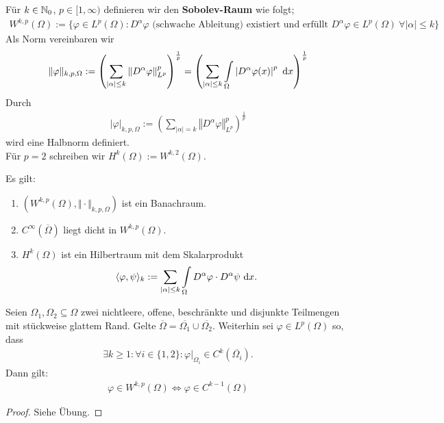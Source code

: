 \begin{definition}
Für $k\in\mathbb{N}_0$, $p\in[1,\infty)$ definieren wir den \textbf{Sobolev-Raum} wie folgt;
\begin{align}
W^{k,p}(\Omega):=\Big\lbrace\varphi\in L^p(\Omega):D^\alpha\varphi\text{ (schwache Ableitung) existiert und erfüllt }D^\alpha\varphi\in L^p(\Omega)~\forall|\alpha|\leq k\Big\rbrace
\end{align}
Als Norm vereinbaren wir
\begin{align*}
\Vert\varphi\Vert_{k,p,\Omega}:=\left(\sum\limits_{|\alpha|\leq k}\left\Vert D^\alpha\varphi\right\Vert^p_{L^p}\right)^{\frac{1}{p}}
=\left(\sum\limits_{|\alpha|\leq k}\int\limits_\Omega\left| D^\alpha\varphi(x)\right|^p\text{ d} x\right)^{\frac{1}{p}}
\end{align*}
Durch
\begin{align*}
|\varphi|_{k,p,\Omega}:=\left(\sum\limits_{|\alpha|= k}\left\Vert D^\alpha\varphi\right\Vert^p_{L^p}\right)^{\frac{1}{p}}
\end{align*}
wird eine Halbnorm definiert.\\
Für $p=2$ schreiben wir $H^k(\Omega):=W^{k,2}(\Omega)$.
\end{definition}

\begin{satz}
Es gilt:
\begin{enumerate}
\item $\left(W^{k,p}(\Omega),\Vert\cdot\Vert_{k,p,\Omega}\right)$ ist ein Banachraum.
\item $C^\infty(\overline{\Omega})$ liegt dicht in $W^{k,p}(\Omega)$.
\item $H^k(\Omega)$ ist ein Hilbertraum mit dem Skalarprodukt
\begin{align*}
\langle \varphi,\psi\rangle_k:=\sum\limits_{|\alpha|\leq k}\int\limits_\Omega D^\alpha\varphi\cdot D^\alpha\psi\text{ d} x.
\end{align*}
\end{enumerate}
\end{satz}

\begin{satz}\enter
Seien $\Omega_1,\Omega_2\subseteq\Omega$ zwei nichtleere, offene, beschränkte und disjunkte Teilmengen mit stückweise glattem Rand. Gelte
$\overline{\Omega}=\overline{\Omega_1}\cup\overline{\Omega_2}$.
Weiterhin sei $\varphi\in L^p(\Omega)$ so, dass 
\begin{align*}
\exists k\geq 1:\forall i\in\lbrace1,2\rbrace:\varphi|_{\Omega_i}\in C^k(\overline{\Omega_i}).
\end{align*}
Dann gilt:
\begin{align*}
\varphi\in W^{k,p}(\Omega)\Longleftrightarrow\varphi\in C^{k-1}(\Omega)
\end{align*}
\end{satz}
\begin{proof}
Siehe Übung.
\end{proof}

